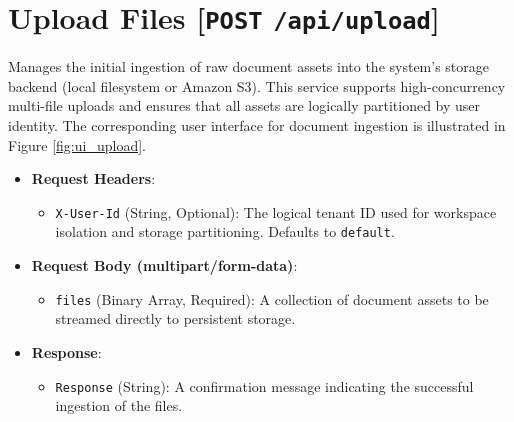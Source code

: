 \section*{Upload Files [\texttt{POST} \texttt{/api/upload}]}
Manages the initial ingestion of raw document assets into the system's storage backend (local filesystem or Amazon S3). This service supports high-concurrency multi-file uploads and ensures that all assets are logically partitioned by user identity. The corresponding user interface for document ingestion is illustrated in Figure \ref{fig:ui_upload}.

\begin{itemize}
    \item \textbf{Request Headers}:
    \begin{itemize}
        \item \texttt{X-User-Id} (String, Optional): The logical tenant ID used for workspace isolation and storage partitioning. Defaults to \texttt{default}.
    \end{itemize}
    \item \textbf{Request Body (multipart/form-data)}:
    \begin{itemize}
        \item \texttt{files} (Binary Array, Required): A collection of document assets to be streamed directly to persistent storage.
    \end{itemize}
    \item \textbf{Response}:
    \begin{itemize}
        \item \texttt{Response} (String): A confirmation message indicating the successful ingestion of the files.
    \end{itemize}
\end{itemize}

